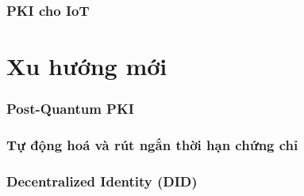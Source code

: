 \subsubsection*{PKI cho IoT}

\section{Xu hướng mới}
\label{sec:7.2}

\subsubsection*{Post-Quantum PKI}

\subsubsection*{Tự động hoá và rút ngắn thời hạn chứng chỉ}

\subsubsection*{Decentralized Identity (DID)}
